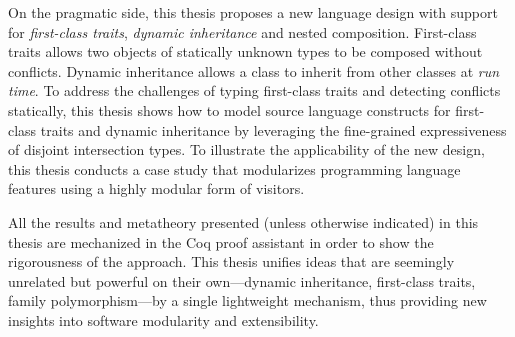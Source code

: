 On the pragmatic side, this thesis proposes a new language design with support
for \textit{first-class traits}, \textit{dynamic inheritance} and nested
composition. First-class traits allows two objects of statically unknown types
to be composed without conflicts. Dynamic inheritance allows a class to inherit
from other classes at \textit{run time}. To address the challenges of typing
first-class traits and detecting conflicts statically, this thesis shows how to
model source language constructs for first-class traits and dynamic inheritance
by leveraging the fine-grained expressiveness of disjoint intersection types. To
illustrate the applicability of the new design, this thesis conducts a case
study that modularizes programming language features using a highly modular form
of visitors.

All the results and metatheory presented (unless otherwise indicated) in this
thesis are mechanized in the Coq proof assistant in order to show the
rigorousness of the approach. This thesis unifies ideas that are seemingly
unrelated but powerful on their own---dynamic inheritance, first-class traits,
family polymorphism---by a single lightweight mechanism, thus providing new
insights into software modularity and extensibility.
